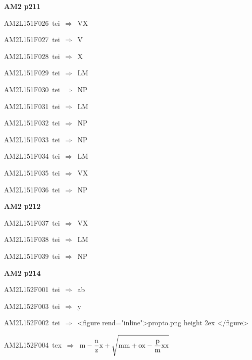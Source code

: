 \par\vfill\eject
{\bf\hfill AM2 p211\hfill\hbox{}}\par\bigskip
{\sixrm AM2L151F026\ {\sixit tei}\ }$\Rightarrow$\ VX\par\smallskip
{\sixrm AM2L151F027\ {\sixit tei}\ }$\Rightarrow$\ V\par\smallskip
{\sixrm AM2L151F028\ {\sixit tei}\ }$\Rightarrow$\ X\par\smallskip
{\sixrm AM2L151F029\ {\sixit tei}\ }$\Rightarrow$\ LM\par\smallskip
{\sixrm AM2L151F030\ {\sixit tei}\ }$\Rightarrow$\ NP\par\smallskip
{\sixrm AM2L151F031\ {\sixit tei}\ }$\Rightarrow$\ LM\par\smallskip
{\sixrm AM2L151F032\ {\sixit tei}\ }$\Rightarrow$\ NP\par\smallskip
{\sixrm AM2L151F033\ {\sixit tei}\ }$\Rightarrow$\ NP\par\smallskip
{\sixrm AM2L151F034\ {\sixit tei}\ }$\Rightarrow$\ LM\par\smallskip
{\sixrm AM2L151F035\ {\sixit tei}\ }$\Rightarrow$\ VX\par\smallskip
{\sixrm AM2L151F036\ {\sixit tei}\ }$\Rightarrow$\ NP\par\smallskip

\par\vfill\eject
{\bf\hfill AM2 p212\hfill\hbox{}}\par\bigskip
{\sixrm AM2L151F037\ {\sixit tei}\ }$\Rightarrow$\ VX\par\smallskip
{\sixrm AM2L151F038\ {\sixit tei}\ }$\Rightarrow$\ LM\par\smallskip
{\sixrm AM2L151F039\ {\sixit tei}\ }$\Rightarrow$\ NP\par\smallskip

\par\vfill\eject
{\bf\hfill AM2 p214\hfill\hbox{}}\par\bigskip
{\sixrm AM2L152F001\ {\sixit tei}\ }$\Rightarrow$\ {\tenit ab}\par\smallskip
{\sixrm AM2L152F003\ {\sixit tei}\ }$\Rightarrow$\ y\par\smallskip
{\sixrm AM2L152F002\ {\sixit tei}\ }$\Rightarrow$\ <figure rend="inline">\XeTeXpicfile propto.png height 2ex </figure>\par\smallskip
{\sixrm AM2L152F004\ {\sixit tex}\ }$\Rightarrow$\ ${\rm m} - {{\displaystyle\strut {\rm n}\over \displaystyle\strut {\rm z}}}{\rm x} + \sqrt{{\rm mm} + {\rm ox} - {{\displaystyle\strut {\rm p}\over \displaystyle\strut {\rm m}}}{\rm xx}}$\par\smallskip

